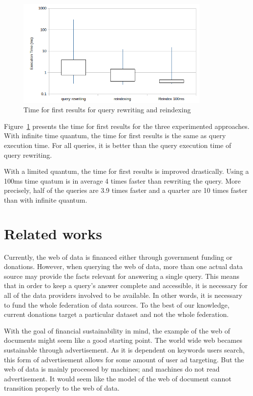 \documentclass[runningheads]{llncs}
\begin{document}

\begin{figure}
  \includegraphics[width=0.85\textwidth]{images/moustacheplot2.png}
  \caption{Time for first results for query rewriting and reindexing}
  \label{fig:res}
\end{figure}

Figure~\ref{fig:res} presents the time for first results for the three experimented approaches.
 With infinite time quantum, the time for first
results is  the same as query execution time. For all queries, it is better than the query execution time of query rewriting.

With a limited quantum, the time for first results is improved
drastically. Using a 100ms time quatum is in average 4 times faster
than rewriting the query. More precisely, half of the queries are 3.9 times faster and a quarter are 10 times faster than with infinite quantum.

\section{Related works}
\label{sec:related-works}

Currently, the web of data is financed either through government
funding or donations.  However, when querying the web of data, more
than one actual data source may provide the facts relevant for
answering a single query. This means that in order to keep a query's
answer complete and accessible, it is necessary for all of the data
providers involved to be available. In other words, it is necessary to
fund the whole federation of data sources. To the best of our
knowledge, current donations target a particular dataset and not the
whole federation.

With the goal of financial sustainability in mind, the example of the
web of documents might seem like a good starting point.  The world
wide web becames sustainable through advertisement. As it is dependent
on keywords users search, this form of advertisement allows for some
amount of user ad targeting.  But the web of data is mainly processed
by machines; and machines do not read advertisement. It would seem
like the model of the web of document cannot transition properly to
the web of data.
\end{document}
